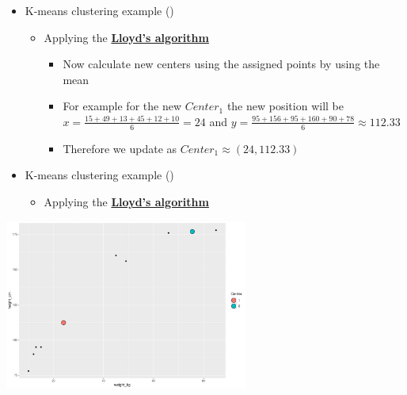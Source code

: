 \documentclass[
  ignorenonframetext,
]{beamer}
\providecommand{\tightlist}{%
  \setlength{\itemsep}{0pt}\setlength{\parskip}{0pt}}\usepackage{longtable,booktabs,array}
\begin{document}
\begin{frame}{}
\label{section-39}
\begin{itemize}
\item
  K-means clustering example
  ()

  \begin{itemize}
  \item
    Applying the
    \href{https://en.wikipedia.org/wiki/K-means_clustering}{\textbf{Lloyd's
    algorithm}}

    \begin{itemize}
    \item
      Now calculate new centers using the assigned points by using the
      mean
    \item
      For example for the new \(Center_1\) the new position will be
      \(x = \frac{15 + 49 + 13 + 45 + 12 + 10}{6} = 24\) and
      \(y = \frac{95 + 156 + 95 + 160 + 90 + 78}{6} \approx 112.33\)
    \item
      Therefore we update as \(Center_1 \approx (24, 112.33)\)
    \end{itemize}
  \end{itemize}
\end{itemize}
\end{frame}

\begin{frame}{}
\label{section-40}
\begin{itemize}
\item
  K-means clustering example
  ()

  \begin{itemize}
  \tightlist
  \item
    Applying the
    \href{https://en.wikipedia.org/wiki/K-means_clustering}{\textbf{Lloyd's
    algorithm}}
  \end{itemize}
\end{itemize}

\begin{center}
\includegraphics[width=0.6\textwidth,height=\textheight]{011_segmentation_clustering_files/figure-beamer/unnamed-chunk-28-1.pdf}
\end{center}
\end{frame}
\end{document}
